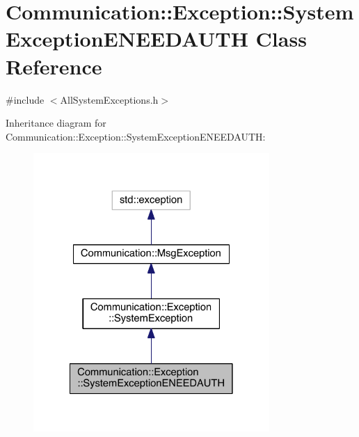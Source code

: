 \hypertarget{class_communication_1_1_exception_1_1_system_exception_e_n_e_e_d_a_u_t_h}{}\section{Communication\+:\+:Exception\+:\+:System\+Exception\+E\+N\+E\+E\+D\+A\+U\+T\+H Class Reference}
\label{class_communication_1_1_exception_1_1_system_exception_e_n_e_e_d_a_u_t_h}


{\ttfamily \#include $<$All\+System\+Exceptions.\+h$>$}



Inheritance diagram for Communication\+:\+:Exception\+:\+:System\+Exception\+E\+N\+E\+E\+D\+A\+U\+T\+H\+:\nopagebreak
\begin{figure}[H]
\begin{center}
\leavevmode
\includegraphics[width=254pt]{class_communication_1_1_exception_1_1_system_exception_e_n_e_e_d_a_u_t_h__inherit__graph}
\end{center}
\end{figure}


